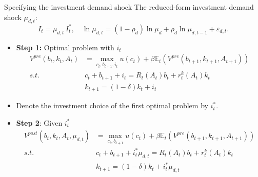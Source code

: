 \documentclass[9pt]{beamer}
\begin{document}
\begin{frame}{Specifying the investment demand shock}
	The reduced-form investment demand shock $\mu_{d,t}$:
		\[
			I_t=\mu_{d,t}\,I_t^{*},\quad
			\ln\mu_{d,t}=(1-\rho_d)\ln\mu_d+\rho_d\ln\mu_{d,t-1}+\varepsilon_{d,t}.
		\]
	\begin{itemize}
		\item \textbf{Step 1:} Optimal problem with $i_t$
		\[\begin{aligned}
            V^{pre}(b_t, k_t, A_t) &= \max_{c_t, b_{t+1}, i_t} u(c_t)
            + \beta \mathbb{E}_t  \left( V^{pre}(b_{t+1}, k_{t+1}, A_{t+1})\right) \\
            s.t. \quad &c_t + b_{t+1} + i_t = R_t(A_t) b_t + r_t^k(A_t) k_t\\
            &  k_{t+1} = (1 - \delta) k_t + i_t
        \end{aligned}
		\]
		\item Denote the investment choice of the first optimal problem by $i_t^*$.
		\item \textbf{Step 2}: Given $i_t^*$
		\[
		\begin{aligned}
            V^{post}(b_t, k_t, A_t, \mu_{d, t}) &= \max_{c_t, b_{t+1}} u(c_t) + \beta \mathbb{E}_t  \left( V^{pre}  (b_{t+1}, k_{t+1}, A_{t+1})\right) \\
            s.t. \quad & c_t + b_{t+1} + i_t^* \mu_{d,t} = R_t(A_t) b_t + r_t^k(A_t) k_t\\
            & k_{t+1} = (1 - \delta) k_t + i_t^* \mu_{d,t}
        \end{aligned}
		\]
	\end{itemize}
\end{frame}
\end{document}
